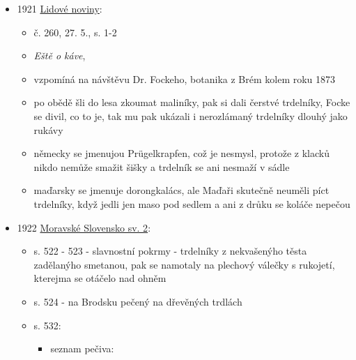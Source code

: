 \begin{itemize}
  \begin{itemize}
  \tightlist
  \item
    jakejsi fejeton, popisuje trhy na Kapucínském náměstí v Brně
  \item
    na konci zmiňuje trdelníky jako vydatný hlty
  \end{itemize}
\item
  1921
  \href{https://www.digitalniknihovna.cz/vkol/uuid/uuid:378abd10-8c6f-11dc-bf07-000d606f5dc6}{Lidové
  noviny}:

  \begin{itemize}
  \tightlist
  \item
    č. 260, 27. 5., s. 1-2
  \item
    \emph{Eště o káve}, 
  \item
    vzpomíná na návštěvu Dr. Fockeho, botanika z Brém kolem roku 1873
  \item
    po obědě šli do lesa zkoumat maliníky, pak si dali čerstvé
    trdelníky, Focke se divil, co to je, tak mu pak ukázali i
    nerozlámaný trdelníky dlouhý jako rukávy
  \item
    německy se jmenujou Prügelkrapfen, což je nesmysl, protože z klacků
    nikdo nemůže smažit šišky a trdelník se ani nesmaží v sádle
  \item
    maďarsky se jmenuje dorongkalács, ale Maďaři skutečně neuměli píct
    trdelníky, když jedli jen maso pod sedlem a ani z drůku se koláče
    nepečou
  \end{itemize}
\item
  1922
  \href{https://ndk.cz/view/uuid:d875fc80-2c59-11e4-8f64-005056827e52?page=uuid\%3A4ba3cc00-5b4e-11e4-a6f0-5ef3fc9ae867&fulltext=trdeln\%C3\%ADky}{Moravské
  Slovensko sv. 2}:

  \begin{itemize}
  \tightlist
  \item
    s. 522 - 523 - slavnostní pokrmy - trdelníky z nekvašenýho těsta
    zadělanýho smetanou, pak se namotaly na plechový válečky s rukojetí,
    kterejma se otáčelo nad ohněm
  \item
    s. 524 - na Brodsku pečený na dřevěných trdlách
  \item
    s. 532:

    \begin{itemize}
    \tightlist
    \item
      seznam pečiva:


\end{itemize}
\end{itemize}
\end{itemize}
